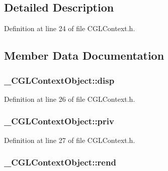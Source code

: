 \subsection{Detailed Description}


Definition at line 24 of file C\-G\-L\-Context.\-h.



\subsection{Member Data Documentation}
\hypertarget{struct___c_g_l_context_object_aa291770f316f46b4324e2fa46f777a27}{
\subsubsection[{disp}]{ \-\_\-\-C\-G\-L\-Context\-Object\-::disp}}\label{struct___c_g_l_context_object_aa291770f316f46b4324e2fa46f777a27}


Definition at line 26 of file C\-G\-L\-Context.\-h.

\hypertarget{struct___c_g_l_context_object_a352c695320144d77502931b57be65140}{
\subsubsection[{priv}]{ \-\_\-\-C\-G\-L\-Context\-Object\-::priv}}\label{struct___c_g_l_context_object_a352c695320144d77502931b57be65140}


Definition at line 27 of file C\-G\-L\-Context.\-h.

\hypertarget{struct___c_g_l_context_object_ac6f613aaaa3bccc159301c77b21c2936}{
\subsubsection[{rend}]{ \-\_\-\-C\-G\-L\-Context\-Object\-::rend}}\label{struct___c_g_l_context_object_ac6f613aaaa3bccc159301c77b21c2936}


